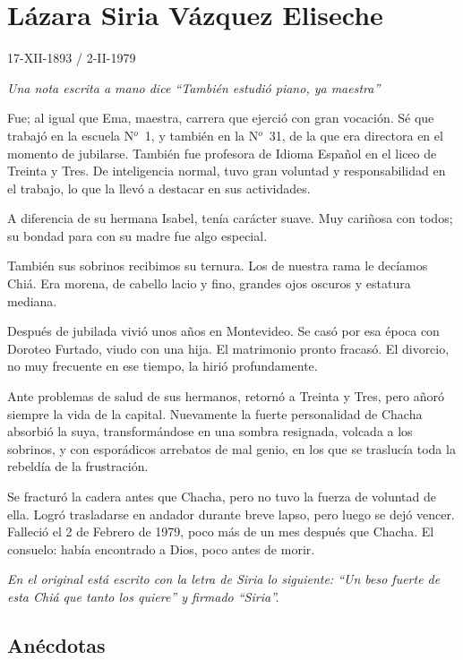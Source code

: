 \documentclass[a4paper]{article}
\begin{document}
\section{Lázara Siria Vázquez Eliseche}

17-XII-1893 / 2-II-1979

\bigbreak{}

\emph{Una nota escrita a mano dice ``También estudió piano, ya maestra''}

\bigbreak{}

Fue; al igual que Ema, maestra, carrera que ejerció con gran vocación. Sé que trabajó en la escuela N$^o$~1, y también en la N$^o$~31, de la que era directora en el momento de jubilarse. También fue profesora de Idioma Español en el liceo de Treinta y Tres. De inteligencia normal, tuvo gran voluntad y responsabilidad en el trabajo, lo que la llevó a destacar en sus actividades.

A diferencia de su hermana Isabel, tenía carácter suave. Muy cariñosa con todos; su bondad para con su madre fue algo especial.

También sus sobrinos recibimos su ternura. Los de nuestra rama le decíamos Chiá. Era morena, de cabello lacio y fino, grandes ojos oscuros y estatura mediana.

Después de jubilada vivió unos años en Montevideo. Se casó por esa época con Doroteo Furtado, viudo con una hija. El matrimonio pronto fracasó. El divorcio, no muy frecuente en ese tiempo, la hirió profundamente.

Ante problemas de salud de sus hermanos, retornó a Treinta y Tres, pero añoró siempre la vida de la capital. Nuevamente la fuerte personalidad de Chacha absorbió la suya, transformándose en una sombra resignada, volcada a los sobrinos, y con esporádicos arrebatos de mal genio, en los que se traslucía toda la rebeldía de la frustración.

Se fracturó la cadera antes que Chacha, pero no tuvo la fuerza de voluntad de ella. Logró trasladarse en andador durante breve lapso, pero luego se dejó vencer. Falleció el 2 de Febrero de 1979, poco más de un mes después que Chacha. El consuelo: había encontrado a Dios, poco antes de morir.

\emph{En el original está escrito con la letra de Siria lo siguiente: ``Un beso fuerte de esta Chiá que tanto los quiere'' y firmado ``Siria''.}

\subsection{Anécdotas}
\end{document}
